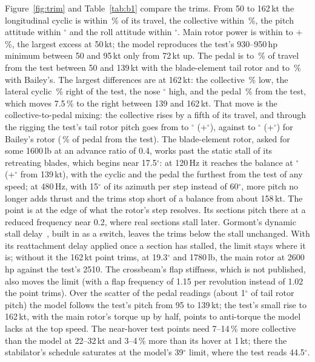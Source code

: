 \documentclass[10pt,a4paper,twocolumn]{article}
\begin{document}
Figure~\ref{fig:trim} and Table~\ref{tab:b1} compare the trims. From 50 to 162\,kt the longitudinal cyclic is within
\NBmaxlon\,\% of its travel, the collective within \NBmaxcoll\,\%, the pitch attitude within \NBmaxtheta$^\circ$ and the roll attitude within
\NBmaxphi$^\circ$. Main rotor power is within \NBpowmin{} to $+$\NBpowmax\,\%, the largest excess at 50\,kt; the model
reproduces the test's 930--950\,hp minimum between 50 and 95\,kt only from 72\,kt up. The pedal is \NBpedmin{} to \NBpedmax\,\% of travel from
the test between 50 and 139\,kt with the blade-element tail rotor and \NBYpedmin{} to \NBYpedmax\,\% with Bailey's. The largest
differences are at 162\,kt: the collective \NBcollhi\,\% low, the lateral cyclic \NBmaxlat\,\% right of the test, the nose
\NBthetahi$^\circ$ high, and the pedal \NBpedhs\,\% from the test, which moves 7.5\,\% to the right between 139 and 162\,kt. That move is the
collective-to-pedal mixing: the collective rises by a fifth of its travel, and through the rigging the test's tail rotor pitch goes from
\NBtrpTlo{} to \NBtrpThi$^\circ$ (+\NBtrpTrise$^\circ$), against \NBtrpYlo{} to \NBtrpYhi$^\circ$ (+\NBtrpYrise$^\circ$) for Bailey's rotor
(\NBYpedhs\,\% of pedal from the test). The blade-element rotor, asked for some 1600\,lb at an advance ratio of 0.4, works past
the static stall of its retreating blades, which begins near 17.5$^\circ$: at 120\,Hz it reaches the balance at \NBtrpMhi$^\circ$
(+\NBtrpMrise$^\circ$ from 139\,kt), with the cyclic and the pedal the furthest from the test of any speed; at 480\,Hz, with 15$^\circ$
of its azimuth per step instead of 60$^\circ$, more pitch no longer adds thrust and the trims stop short of a balance from about 158\,kt.
The point is at the edge of what the rotor's step resolves. Its sections pitch there at a reduced frequency near 0.2, where real
sections stall later. Gormont's dynamic stall delay~\cite{gorm},
built in as a switch, leaves the trims below the stall unchanged. With its reattachment delay applied once a section has stalled, the limit
stays where it is; without it the 162\,kt point trims, at 19.3$^\circ$ and 1780\,lb, the main rotor at 2600\,hp against the test's 2510. The crossbeam's flap stiffness, which is
not published, also moves the limit (with a flap frequency of 1.15 per revolution instead of 1.02 the point trims). Over the scatter of the
pedal readings (about 1$^\circ$ of tail rotor pitch) the model follows the test's pitch from 95 to 139\,kt; the test's small rise to 162\,kt,
with the main rotor's torque up by half, points to anti-torque the model lacks at the top speed. The near-hover test points need 7--14\,\% more collective than the model at 22--32\,kt and 3--4\,\% more than its
hover at 1\,kt; there the stabilator's schedule saturates at the model's 39$^\circ$ limit, where the test reads 44.5$^\circ$.
\end{document}
